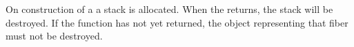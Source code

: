 \label{destruction}

On construction of a \fiber a stack is allocated. When the \entryfn returns,
the stack will be destroyed. If the function has not yet returned,
the \fiber object representing that fiber must not be destroyed.



